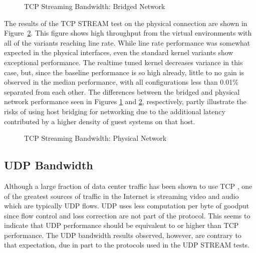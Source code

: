 \begin{figure}
    \centering
    \def\svgwidth{\columnwidth}
    
    \caption{TCP Streaming Bandwidth: Bridged Network}
    \label{fig:tcp_stream_bridge}
\end{figure}

The results of the TCP STREAM test on the physical connection are shown in Figure~\ref{fig:tcp_stream_phys}.
This figure shows high throughput from the virtual environments with all of the variants reaching line rate.
While line rate performance was somewhat expected in the physical interfaces, even the standard kernel variants show exceptional performance.
The realtime tuned kernel decreases variance in this case, but, since the baseline performance is so high already, little to no gain is observed in the median performance, with all configurations less than 0.01\% separated from each other.  
The differences between the bridged and physical network performance seen in Figures \ref{fig:tcp_stream_bridge} and \ref{fig:tcp_stream_phys}, respectively, partly illustrate the risks of using host bridging for networking due to the additional latency contributed by a higher density of guest systems on that host.  

\begin{figure}
    \centering
    \def\svgwidth{\columnwidth}
    
    \caption{TCP Streaming Bandwidth: Physical Network}
    \label{fig:tcp_stream_phys}
\end{figure}

\subsection{UDP Bandwidth} %
\label{sub:udpbandwidth}
Although a large fraction of data center traffic has been shown to use TCP \autocite{haTCPCloud2013}, one of the greatest sources of traffic in the Internet is streaming video and audio which are typically UDP flows.
UDP uses less computation per byte of goodput since flow control and loss correction are not part of the protocol.  
This seems to indicate that UDP performance should be equivalent to or higher than TCP performance.  
The UDP bandwidth results observed, however, are contrary to that expectation, due in part to the protocols used in the UDP STREAM tests.


